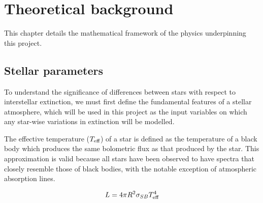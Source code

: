 \documentclass[12pt, a4paper]{report}
\begin{document}
\chapter{Theoretical background}
This chapter details the mathematical framework of the physics underpinning this project.
\section{Stellar parameters}
To understand the significance of differences between stars with respect to interstellar extinction, we must first define the fundamental features of a stellar atmosphere, which will be used in this project as the input variables on which any star-wise variations in extinction will be modelled.

The effective temperature ($T_{\textnormal{eff}}$) of a star is defined as the temperature of a black body which produces the same bolometric flux as that produced by the star. This approximation is valid because all stars have been observed to have spectra that closely resemble those of black bodies, with the notable exception of atmospheric absorption lines.

\begin{equation}
L = 4 \pi R^{2} \sigma_{SB} T_{\textnormal{eff}}^{4}
\label{Teff_def}
\end{equation}
\end{document}
